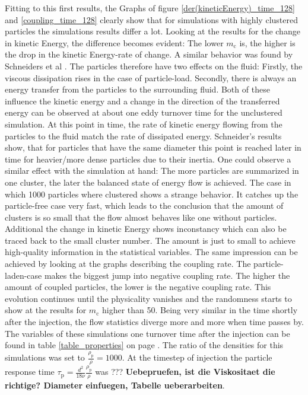 \documentclass[11pt,a4paper,openany,oneside,parskip=half*]{article}
\begin{document}
Fitting to this first results, the Graphs of figure \ref{der(kineticEnergy)_time_128} and \ref{coupling_time_128} clearly show that for simulations with highly clustered particles the simulations results differ a lot. Looking at the results for the change in kinetic Energy, the difference becomes evident: The lower $ m_\mathrm{c} $ is, the higher is the drop in the kinetic Energy-rate of change. A similar behavior was found by Schneiders et al \cite{Schneiders2017}. The particles therefore have two effects on the fluid: Firstly, the viscous dissipation rises in the case of particle-load. Secondly, there is always an energy transfer from the particles to the surrounding fluid. Both of these influence the kinetic energy and a change in the direction of the transferred energy can be observed at about one eddy turnover time for the unclustered simulation. At this point in time, the rate of kinetic energy flowing from the particles to the fluid match the rate of dissipated energy. Schneider's results show, that for particles that have the same diameter this point is reached later in time for heavier/more dense particles due to their inertia. One could observe a similar effect with the simulation at hand: The more particles are summarized in one cluster, the later the balanced state of energy flow is achieved. 
\newline 
The case in which 1000 particles where clustered shows a strange behavior. It catches up the particle-free case very fast, which leads to the conclusion that the amount of clusters is so small that the flow almost behaves like one without particles. Additional the change in kinetic Energy shows inconstancy which can also be traced back to the small cluster number. The amount is just to small to achieve high-quality information in the statistical variables. 
\newline
The same impression can be achieved by looking at the graphs describing the coupling rate. The particle-laden-case makes the biggest jump into negative coupling rate. The higher the amount of coupled particles, the lower is the negative coupling rate. This evolution continues until the physicality vanishes and the randomness starts to show at the results for $m_\mathrm{c}$ higher than 50. 
\newline
Being very similar in the time shortly after the injection, the flow statistics diverge more and more when time passes by. The variables of these simulations one turnover time after the injection can be found in table \ref{table_properties} on page \pageref{table_properties}. The ratio of the densities for this simulations was set to $\frac{\rho_\mathrm{p}}{\rho} = 1000$. At the timestep of injection the particle response time $\tau_\mathrm{p}=\frac{d^2}{18 \nu} \frac{\rho_\mathrm{p}}{\rho}$ was ??? \textbf{Uebepruefen, ist die Viskositaet die richtige? Diameter einfuegen, Tabelle ueberarbeiten}.
\end{document}

